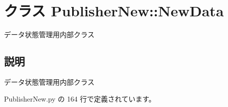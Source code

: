 \section{クラス PublisherNew::NewData}
\label{classsource__py_1_1_publisher_new_1_1_publisher_new_1_1_new_data}
データ状態管理用内部クラス  




\subsection{説明}
データ状態管理用内部クラス 

 PublisherNew.py の 164 行で定義されています。